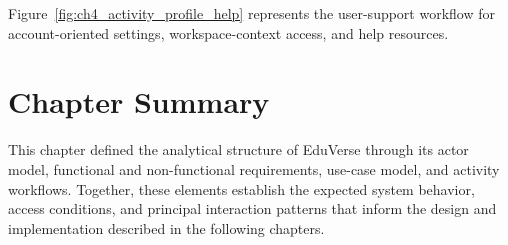 Figure~\ref{fig:ch4_activity_profile_help} represents the user-support workflow
for account-oriented settings, workspace-context access, and help resources.

\clearpage

\section{Chapter Summary}\label{sec:chapter4_summary}

This chapter defined the analytical structure of EduVerse through its actor
model, functional and non-functional requirements, use-case model, and activity
workflows. Together, these elements establish the expected system behavior,
access conditions, and principal interaction patterns that inform the design
and implementation described in the following chapters.

